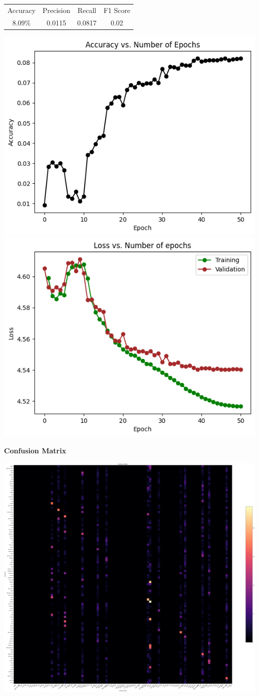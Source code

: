 \documentclass{article}
\begin{document}
\begin{center}
\begin{tabular}{ |c|c|c|c| } 
 \hline
 Accuracy & Precision & Recall & F1 Score \\ 
 8.09\% & 0.0115 & 0.0817 & 0.02 \\
 \hline
\end{tabular}
\end{center}

\includegraphics[width=0.5\linewidth]{images/Softmax/accvsloss.png}
\includegraphics[width=0.5\linewidth]{images/Softmax/lossvsepochs.png}
\vspace{6pt}


\textbf{Confusion Matrix}

\includegraphics[width=0.9\linewidth]{images/Softmax/highres-softmax-resnet12.png}
\end{document}
